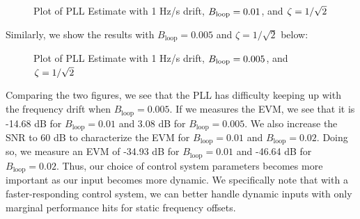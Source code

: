 \documentclass{article}
\begin{document}
\begin{figure}[H]
	\centerline{}
	\caption{Plot of PLL Estimate with 1 Hz/s drift, $\protect{B_\text{loop}} = 0.01$, and $\protect{\zeta = 1/\sqrt{2}}$}
	\label{fig::convergence_1Hz_drift_Bloop_0p01_damp_sqrt_2}
\end{figure}

\noindent Similarly, we show the results with $B_{\text{loop}} = 0.005$ and $\zeta = 1/\sqrt{2}$ below:

\begin{figure}[H]
	\centerline{}
	\caption{Plot of PLL Estimate with 1 Hz/s drift, $\protect{B_\text{loop}} = 0.005$, and $\protect{\zeta = 1/\sqrt{2}}$}
	\label{fig::convergence_1Hz_drift_Bloop_0p005_damp_sqrt_2}
\end{figure}

\noindent Comparing the two figures, we see that the PLL has difficulty keeping up with the frequency drift when $B_\text{loop} = 0.005$. If we measures the EVM, we see that it is -14.68 dB for $B_\text{loop} = 0.01$ and 3.08 dB for $B_\text{loop} = 0.005$. We also increase the SNR to 60 dB to characterize the EVM for $B_\text{loop} = 0.01$ and $B_\text{loop} = 0.02$. Doing so, we measure an EVM of -34.93 dB for $B_\text{loop} = 0.01$ and -46.64 dB for $B_\text{loop} = 0.02$. Thus, our choice of control system parameters becomes more important as our input becomes more dynamic. We specifically note that with a faster-responding control system, we can better handle dynamic inputs with only marginal  performance hits for static frequency offsets.
\end{document}
